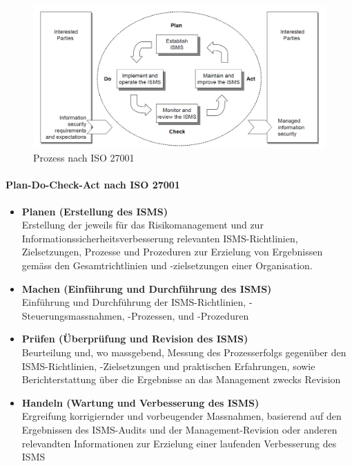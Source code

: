 \documentclass[10pt,a4paper]{article}
\begin{document}
\begin{figure}[H]
    \begin{center}
    \includegraphics[width=16cm]{images/iso27001.png}
    \caption{Prozess nach ISO 27001 \cite{iso27001}}
    \label{iso27001}
    \end{center}
\end{figure}

\paragraph*{Plan-Do-Check-Act nach ISO 27001}
\begin{itemize}[noitemsep,topsep=0pt,leftmargin=*]
    \item \textbf{Planen (Erstellung des ISMS)}\\
    Erstellung der jeweils für das Risikomanagement und zur Informationssicherheitsverbesserung relevanten ISMS-Richtlinien, Zielsetzungen, Prozesse und Prozeduren zur Erzielung von Ergebnissen gemäss den Gesamtrichtlinien und -zielsetzungen einer Organisation.
    \item \textbf{Machen (Einführung und Durchführung des ISMS)}\\
    Einführung und Durchführung der ISMS-Richtlinien, -Steuerungsmassnahmen, -Prozessen, und -Prozeduren
    \item \textbf{Prüfen (Überprüfung und Revision des ISMS)}\\
    Beurteilung und, wo massgebend, Messung des Prozesserfolgs gegenüber den ISMS-Richtlinien, -Zielsetzungen und praktischen Erfahrungen, sowie Berichterstattung über die Ergebnisse an das Management zwecks Revision
    \item \textbf{Handeln (Wartung und Verbesserung des ISMS)}\\
    Ergreifung korrigiernder und vorbeugender Massnahmen, basierend auf den Ergebnissen des ISMS-Audits und der Management-Revision oder anderen relevandten Informationen zur Erzielung einer laufenden Verbesserung des ISMS
\end{itemize}
\end{document}
